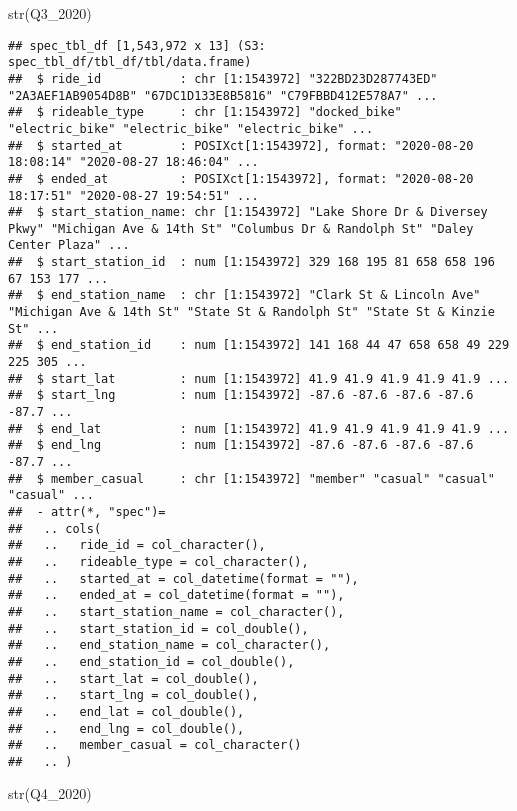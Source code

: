 \documentclass[
]{article}
\newenvironment{Shaded}{\begin{snugshade}}{\end{snugshade}}
\newcommand{\FunctionTok}[1]{\textcolor[rgb]{0.00,0.00,0.00}{#1}}
\newcommand{\NormalTok}[1]{#1}
\begin{document}
\begin{Shaded}
\begin{Highlighting}[]
  \FunctionTok{str}\NormalTok{(Q3\_2020)}
\end{Highlighting}
\end{Shaded}

\begin{verbatim}
## spec_tbl_df [1,543,972 x 13] (S3: spec_tbl_df/tbl_df/tbl/data.frame)
##  $ ride_id           : chr [1:1543972] "322BD23D287743ED" "2A3AEF1AB9054D8B" "67DC1D133E8B5816" "C79FBBD412E578A7" ...
##  $ rideable_type     : chr [1:1543972] "docked_bike" "electric_bike" "electric_bike" "electric_bike" ...
##  $ started_at        : POSIXct[1:1543972], format: "2020-08-20 18:08:14" "2020-08-27 18:46:04" ...
##  $ ended_at          : POSIXct[1:1543972], format: "2020-08-20 18:17:51" "2020-08-27 19:54:51" ...
##  $ start_station_name: chr [1:1543972] "Lake Shore Dr & Diversey Pkwy" "Michigan Ave & 14th St" "Columbus Dr & Randolph St" "Daley Center Plaza" ...
##  $ start_station_id  : num [1:1543972] 329 168 195 81 658 658 196 67 153 177 ...
##  $ end_station_name  : chr [1:1543972] "Clark St & Lincoln Ave" "Michigan Ave & 14th St" "State St & Randolph St" "State St & Kinzie St" ...
##  $ end_station_id    : num [1:1543972] 141 168 44 47 658 658 49 229 225 305 ...
##  $ start_lat         : num [1:1543972] 41.9 41.9 41.9 41.9 41.9 ...
##  $ start_lng         : num [1:1543972] -87.6 -87.6 -87.6 -87.6 -87.7 ...
##  $ end_lat           : num [1:1543972] 41.9 41.9 41.9 41.9 41.9 ...
##  $ end_lng           : num [1:1543972] -87.6 -87.6 -87.6 -87.6 -87.7 ...
##  $ member_casual     : chr [1:1543972] "member" "casual" "casual" "casual" ...
##  - attr(*, "spec")=
##   .. cols(
##   ..   ride_id = col_character(),
##   ..   rideable_type = col_character(),
##   ..   started_at = col_datetime(format = ""),
##   ..   ended_at = col_datetime(format = ""),
##   ..   start_station_name = col_character(),
##   ..   start_station_id = col_double(),
##   ..   end_station_name = col_character(),
##   ..   end_station_id = col_double(),
##   ..   start_lat = col_double(),
##   ..   start_lng = col_double(),
##   ..   end_lat = col_double(),
##   ..   end_lng = col_double(),
##   ..   member_casual = col_character()
##   .. )
\end{verbatim}

\begin{Shaded}
\begin{Highlighting}[]
  \FunctionTok{str}\NormalTok{(Q4\_2020)}
\end{Highlighting}
\end{Shaded}
\end{document}
